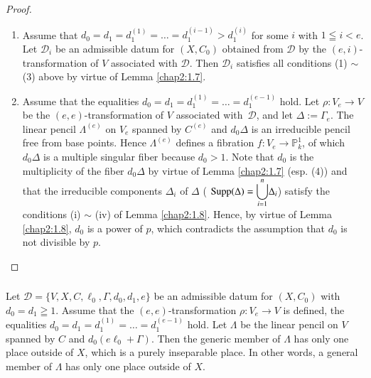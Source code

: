 \begin{proof}
\begin{enumerate}
\renewcommand{\theenumi}{\Roman{enumi}}
\renewcommand{\labelenumi}{\rm(\theenumi)}
\item Assume that
  $d_{0}=d_{1}=d_{1}^{(1)}=\ldots=d_{1}^{(i-1)}>d_{1}^{(i)}$ for some
  $i$ with $1\leqq i<e$. Let $\mathscr{D}_{i}$ be an admissible datum
  for $(X,C_{0})$ obtained from $\mathscr{D}$ by the
  $(e,i)$-transformation of $V$ associated with $\mathscr{D}$. Then
  $\mathscr{D}_{i}$ satisfies all conditions (1) $\sim$ (3) above by
  virtue of Lemma \ref{chap2:1.7}.

\item Assume that the equalities
  $d_{0}=d_{1}=d_{1}^{(1)}=\ldots=d_{1}^{(e-1)}$ hold. Let
  $\rho:V_{e}\to V$ be the $(e,e)$-transformation of $V$ associated
  with\pageoriginale\ $\mathscr{D}$, and let $\Delta:=\Gamma_{e}$. The
  linear pencil $\Lambda^{(e)}$ on $V_{e}$ spanned by $C^{(e)}$ and
  $d_{0}\Delta$ is an irreducible pencil free from base points. Hence
  $\Lambda^{(e)}$ defines a fibration $f:V_{e}\to \mathbb{P}^{1}_{k}$,
  of which $d_{0}\Delta$ is a multiple singular fiber because
  $d_{0}>1$. Note that $d_{0}$ is the multiplicity of the fiber
  $d_{0}\Delta$ by virtue of Lemma \ref{chap2:1.7} (esp. (4)) and that
  the irreducible components $\Delta_{i}$ of $\Delta$ (\iec
  $\operatorname{Supp}(\Delta)={\displaystyle{\mathop{\bigcup}^{n}_{i=1}}}\Delta_{i}$)
  satisfy the conditions (i) $\sim$ (iv) of Lemma \ref{chap2:1.8}. Hence,
  by virtue of Lemma \ref{chap2:1.8}, $d_{0}$ is a power of $p$, which
  contradicts the assumption that $d_{0}$ is not divisible by
  $p$.
\end{enumerate}
\end{proof}

\subsubsection{}\label{chap2:1.9.2}
\begin{coro*}
  Let $\mathscr{D}=\{V,X,C,\ell_{0},\Gamma,d_{0},d_{1},e\}$ be an
  admissible datum for $(X,C_{0})$ with $d_{0}=d_{1}\geqq 1$. Assume
  that the $(e,e)$-transformation $\rho:V_{e}\to V$ is defined, \iec the
  equalities $d_{0}=d_{1}=d^{(1)}_{1}=\ldots=d_{1}^{(e-1)}$ hold. Let
  $\Lambda$ be the linear pencil on $V$ spanned by $C$ and
  $d_{0}(e\ell_{0}+\Gamma)$. Then the generic member of $\Lambda$ has
  only one place outside of $X$, which is a purely inseparable place. In
  other words, a general member of $\Lambda$ has only one place outside
  of $X$.
\end{coro*}

